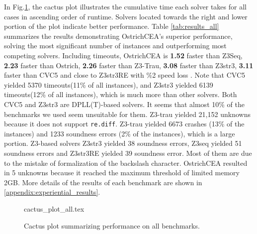 {  %
  In Fig.\ref{fig:cactus_all}, the cactus plot illustrates the cumulative time each solver takes for all cases in ascending order of runtime. Solvers located towards the right and lower portion of the plot indicate better performance. \newline
  Table \ref{tab:results_all} summarizes the results demonstrating OstrichCEA's superior performance, solving the most significant number of instances and outperforming most competing solvers. Including timeouts, OstrichCEA is \textbf{1.52}\mult{} faster than Z3Seq, \textbf{2.23}\mult{} faster than Ostrich, \textbf{2.26}\mult{} faster than Z3-Trau, \textbf{3.08}\mult{} faster than Z3str3, \textbf{3.11}\mult{} faster than CVC5 and close to Z3str3RE with \%2 speed loss . Note that CVC5\cite{cvc5} yielded 5370 timeouts(11\% of all instances), and Z3str3\cite{z3str3} yielded 6139 timeouts(12\% of all instances), which is much more than other solvers. Both CVC5 and Z3str3 are DPLL(T)-based solvers. It seems that almost 10\% of the benchmarks we used seem unsuitable for them. Z3-trau\cite{z3trau} yielded 21,152 unknowns because it does not support \verb|re.diff|. Z3-trau\cite{z3trau} yielded 6673 crashes (13\% of the instances) and 1233 soundness errors (2\% of the instances), which is a large portion. Z3-based solvers Z3str3 yielded 38 soundness errors, Z3seq\cite{z3seq} yielded 51 soundness errors and Z3str3RE\cite{z3str3re} yielded 39 soundness error. Most of them are due to the mistake of formalization of the backslash character. OstrichCEA resulted in 5 unknowns because it reached the maximum threshold of limited memory 2GB. More details of the results of each benchmark are shown in \ref{appendix:experiential_results}.
  \begin{figure}[h]
    \centering
    {cactus_plot_all.tex}
    \caption{Cactus plot summarizing performance on all benchmarks.}
    \label{fig:cactus_all}
  \end{figure}

}
